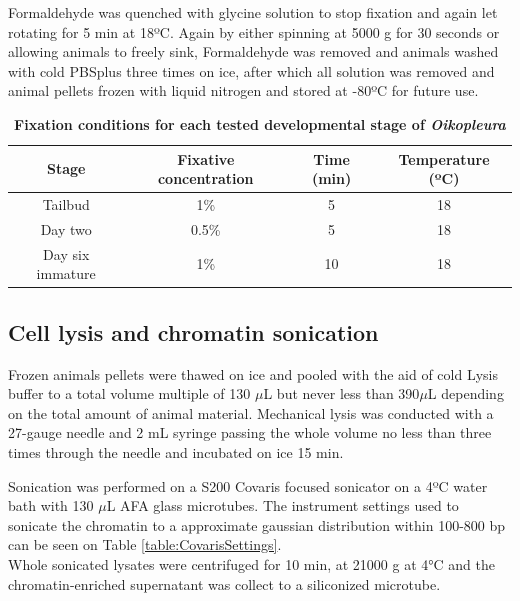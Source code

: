 \documentclass[11pt,twoside,a4paper]{report}
\begin{document}
			Formaldehyde was quenched with glycine solution to stop fixation and again let rotating for 5 min at 18ºC. 
			Again by either spinning at 5000 g for 30 seconds or allowing animals to freely sink, Formaldehyde was removed and animals washed with cold PBSplus three times on ice, after which all solution was removed and animal pellets frozen with liquid nitrogen and stored at -80ºC for future use.
    
    		 \begin{table}[!ht]
	    	    \caption{\bf{Fixation conditions for each tested developmental stage of \textit{Oikopleura}}}
        		\begin{center}
		            \begin{tabular}{c|c|c|c}
                		\textbf{Stage} & \textbf{Fixative concentration} & \textbf{Time (min)} & \textbf{Temperature (ºC)}\\
		                \hline
		                Tailbud & 1\% & 5 & 18\\
		                Day two & 0.5\% & 5 & 18\\
		                Day six immature & 1\% & 10 & 18\\
        		    \end{tabular}
		        \end{center}
        		\label{table:ODfixation}
		    \end{table}
    
    			\subsection{Cell lysis and chromatin sonication}
			Frozen animals pellets were thawed on ice and pooled with the aid of cold Lysis buffer to a total volume multiple of 130 $\mu$L but never less than 390$\mu$L depending on the total amount of animal material.		
			Mechanical lysis was conducted with a 27-gauge needle and 2 mL syringe passing the whole volume no less than three times through the needle and incubated on ice 15 min.
			
			Sonication was performed on a S200 Covaris focused sonicator on a 4ºC water bath with 130 $\mu$L AFA glass microtubes. The instrument settings used to sonicate the chromatin to a approximate gaussian distribution within 100-800 bp can be seen on Table \ref{table:CovarisSettings}. \\
			Whole sonicated lysates were centrifuged for 10 min, at 21000 g at 4°C and the chromatin-enriched supernatant was collect to a siliconized microtube.
			
\end{document}
